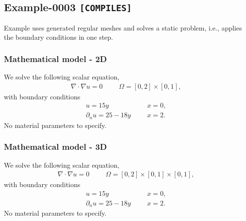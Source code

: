 %
\clearpage
%
\subsection{Example-0003 \texttt{[COMPILES]}}
%
Example uses generated regular meshes and solves a static problem, i.e., applies
the boundary conditions in one step.
%
%
\subsubsection{Mathematical model - 2D}
%
We solve the following scalar equation,
%
\begin{align}
    \nabla \cdot \nabla u = 0 & &&\Omega = [0, 2] \times [0, 1],
\end{align}
%
with boundary conditions
%
\begin{align}
    u = 15 y                 & &&x = 0, \\
    \partial_n u = 25 - 18 y & &&x = 2.
\end{align}
%
No material parameters to specify.
%
%
\subsubsection{Mathematical model - 3D}
%
We solve the following scalar equation,
%
\begin{align}
    \nabla \cdot \nabla u = 0 & &&\Omega = [0, 2] \times [0, 1] \times [0, 1],
\end{align}
%
with boundary conditions
%
\begin{align}
    u = 15 y                 & &&x = 0, \\
    \partial_n u = 25 - 18 y & &&x = 2.
\end{align}
%
No material parameters to specify.
%
%
